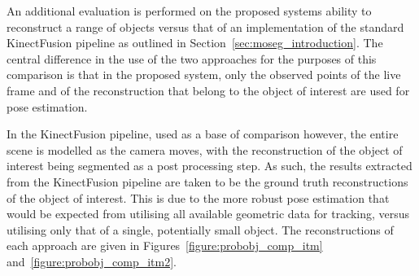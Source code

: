 An additional evaluation is performed on the proposed systems ability to reconstruct 
a range of objects versus that of an implementation of the standard KinectFusion 
pipeline as outlined in Section~\ref{sec:moseg_introduction}. The central difference in 
the use of the two approaches for the purposes of this comparison is that in the proposed 
system, only the observed points of the live frame and of the reconstruction that belong to 
the object of interest are used for pose estimation. 

In the KinectFusion pipeline, used as a base of comparison however, the entire scene is modelled 
as the camera moves, with the reconstruction of the object of interest being segmented as a post 
processing step. As such, the results extracted from the KinectFusion pipeline are taken to be the 
ground truth reconstructions of the object of interest. This is due to the more robust 
pose estimation that would be expected from utilising all available geometric data 
for tracking, versus utilising only that of a single, potentially small object. The reconstructions 
of each approach are given in Figures~\ref{figure:probobj_comp_itm} and~\ref{figure:probobj_comp_itm2}.
